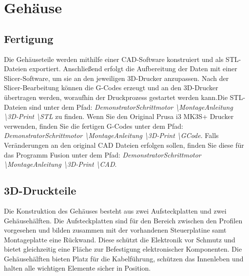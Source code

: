 %
%



\chapter{Gehäuse}

\section{Fertigung}

Die Gehäuseteile werden mithilfe einer CAD-Software konstruiert und als STL-Dateien exportiert. Anschließend erfolgt die Aufbereitung der Daten mit einer Slicer-Software, um sie an den jeweiligen 3D-Drucker anzupassen. Nach der Slicer-Bearbeitung können die G-Codes erzeugt und an den 3D-Drucker übertragen werden, woraufhin der Druckprozess gestartet werden kann.Die STL-Dateien sind unter dem Pfad: \emph{DemonstratorSchrittmotor \textbackslash MontageAnleitung \textbackslash 3D-Print \textbackslash STL} zu finden. Wenn Sie den Original Prusa i3 MK3S+ Drucker verwenden, finden Sie die fertigen G-Codes unter dem Pfad: \emph{DemonstratorSchrittmotor \textbackslash MontageAnleitung \textbackslash 3D-Print \textbackslash GCode}. Falls Veränderungen an den original CAD Dateien erfolgen sollen, finden Sie diese für das Programm Fusion unter dem Pfad: \emph{DemonstratorSchrittmotor \textbackslash MontageAnleitung \textbackslash 3D-Print \textbackslash CAD}.

\section{3D-Druckteile}
Die Konstruktion des Gehäuses besteht aus zwei Aufsteckplatten und zwei Gehäusehälften. Die Aufsteckplatten sind für den Bereich zwischen den Profilen vorgesehen und bilden zusammen mit der vorhandenen Steuerplatine samt Montageplatte eine Rückwand. Diese schützt die Elektronik vor Schmutz und bietet gleichzeitig eine Fläche zur Befestigung elektronischer Komponenten.
Die Gehäusehälften bieten Platz für die Kabelführung, schützen das Innenleben und halten alle wichtigen Elemente sicher in Position.

